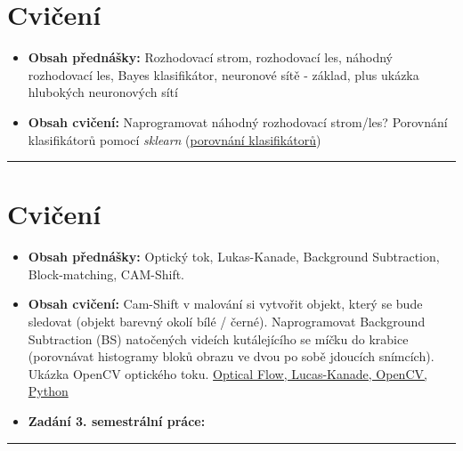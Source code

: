 \documentclass[12pt, a4paper]{article}
\begin{document}
\section{Cvičení}
\begin{itemize}
	\item \par{\textbf{Obsah přednášky:} Rozhodovací strom, rozhodovací les, náhodný rozhodovací les, Bayes klasifikátor, neuronové sítě - základ, plus ukázka hlubokých neuronových sítí}
	\item \par{\textbf{Obsah cvičení:} {\color{red} Naprogramovat náhodný rozhodovací strom/les?} Porovnání klasifikátorů pomocí \textit{sklearn} (\href{http://scikit-learn.org/stable/auto_examples/plot_classifier_comparison.html}{porovnání klasifikátorů})}
\end{itemize}
\noindent\rule[0.5ex]{\linewidth}{0.4pt}
















\section{Cvičení}
\begin{itemize}
	\item \par{\textbf{Obsah přednášky:} Optický tok, Lukas-Kanade, Background Subtraction, Block-matching, CAM-Shift.}
	\item \par{\textbf{Obsah cvičení:} Cam-Shift v malování si vytvořit objekt, který se bude sledovat (objekt barevný okolí bílé / černé). Naprogramovat Background Subtraction (BS) natočených videích kutálejícího se míčku do krabice (porovnávat histogramy bloků obrazu ve dvou po sobě jdoucích snímcích). Ukázka OpenCV optického toku. \href{http://docs.opencv.org/trunk/doc/py_tutorials/py_video/py_lucas_kanade/py_lucas_kanade.html}{Optical Flow, Lucas-Kanade, OpenCV, Python}}
	\item \par{\textbf{Zadání 3. semestrální práce:}}
\end{itemize}
\noindent\rule[0.5ex]{\linewidth}{0.4pt}
\end{document}
